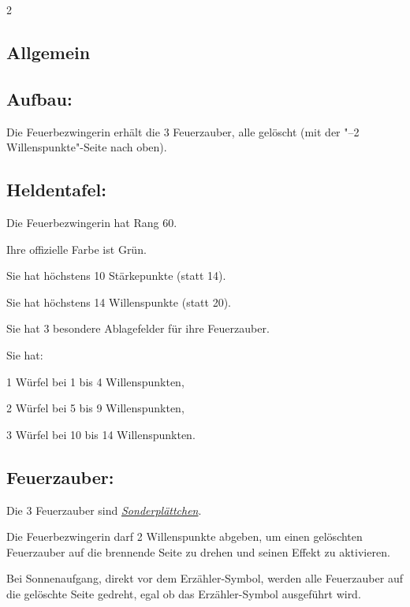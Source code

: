 \documentclass[10pt, a4paper, oneside]{book}
\newcommand{\fan}[1]{\textit{#1}}
\begin{document}
\begin{multicols*}{2}\raggedcolumns


\begin{nobgcolor}

\section{Allgemein}


\subsection{Aufbau:}

Die Feuerbezwingerin erhält die 3 Feuerzauber, alle gelöscht (mit der "–2 Willenspunkte"-Seite nach oben).


\subsection{Heldentafel:}

Die Feuerbezwingerin hat Rang 60.

Ihre offizielle Farbe ist Grün.

Sie hat höchstens 10 Stärkepunkte (statt 14).

Sie hat höchstens 14 Willenspunkte (statt 20).

Sie hat 3 besondere Ablagefelder für ihre Feuerzauber.

Sie hat:

\bullet{} 1 Würfel bei 1 bis 4 Willenspunkten,

\bullet{} 2 Würfel bei 5 bis 9 Willenspunkten,

\bullet{} 3 Würfel bei 10 bis 14 Willenspunkten.





\subsection{Feuerzauber:}

Die 3 Feuerzauber sind \hyperref[gegenstaende-und-sonderplaettchen]{\fan{Sonderplättchen}}.

Die Feuerbezwingerin darf 2 Willenspunkte abgeben, um einen gelöschten Feuerzauber auf die brennende Seite zu drehen und seinen Effekt zu aktivieren.

Bei Sonnenaufgang, direkt vor dem Erzähler-Symbol, werden alle Feuerzauber auf die gelöschte Seite gedreht, egal ob das Erzähler-Symbol ausgeführt wird.



\end{nobgcolor}
\end{multicols*}
\end{document}
